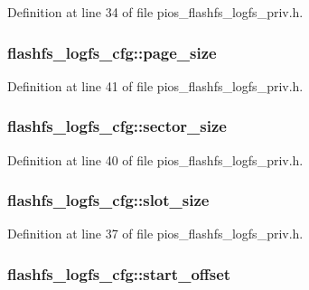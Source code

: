 Definition at line 34 of file pios\-\_\-flashfs\-\_\-logfs\-\_\-priv.\-h.

\hypertarget{group___p_i_o_s___f_l_a_s_h_f_s_ga28ddda808f37b1e0a2d6e8ea25c47c59}{
\subsubsection[{page\-\_\-size}]{ flashfs\-\_\-logfs\-\_\-cfg\-::page\-\_\-size}}\label{group___p_i_o_s___f_l_a_s_h_f_s_ga28ddda808f37b1e0a2d6e8ea25c47c59}


Definition at line 41 of file pios\-\_\-flashfs\-\_\-logfs\-\_\-priv.\-h.

\hypertarget{group___p_i_o_s___f_l_a_s_h_f_s_ga8251b6447774f97389ec08c71e1ed54b}{
\subsubsection[{sector\-\_\-size}]{ flashfs\-\_\-logfs\-\_\-cfg\-::sector\-\_\-size}}\label{group___p_i_o_s___f_l_a_s_h_f_s_ga8251b6447774f97389ec08c71e1ed54b}


Definition at line 40 of file pios\-\_\-flashfs\-\_\-logfs\-\_\-priv.\-h.

\hypertarget{group___p_i_o_s___f_l_a_s_h_f_s_gac9f1463cfe49a3b517bf6c1e44bbb087}{
\subsubsection[{slot\-\_\-size}]{ flashfs\-\_\-logfs\-\_\-cfg\-::slot\-\_\-size}}\label{group___p_i_o_s___f_l_a_s_h_f_s_gac9f1463cfe49a3b517bf6c1e44bbb087}


Definition at line 37 of file pios\-\_\-flashfs\-\_\-logfs\-\_\-priv.\-h.

\hypertarget{group___p_i_o_s___f_l_a_s_h_f_s_ga2a71336371b265bddac688b27ebcb94c}{
\subsubsection[{start\-\_\-offset}]{ flashfs\-\_\-logfs\-\_\-cfg\-::start\-\_\-offset}}\label{group___p_i_o_s___f_l_a_s_h_f_s_ga2a71336371b265bddac688b27ebcb94c}



